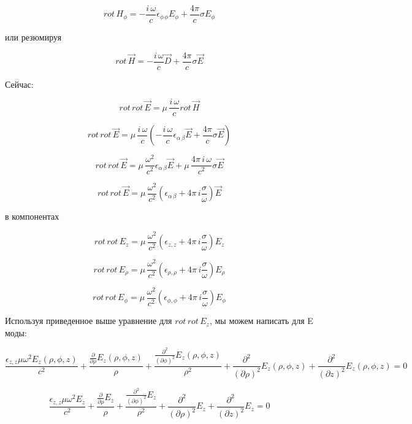 \documentclass{article}
\begin{document}
$$rot\,{H}_{\phi} = - \frac{i\,\omega}{c} \epsilon_{\phi\,\phi} {E}_{\phi}+ \frac{4\pi}{c} \sigma {E}_{\phi}$$

или резюмируя

$$rot\,\vec{H} = - \frac{i\,\omega}{c} \vec{D} + \frac{4\pi}{c} \sigma \vec{E}$$

Сейчас:

$$rot\,rot\,\vec{E} = \mu\,\frac{i\,\omega}{c}rot\,\vec{H}$$

$$rot\,rot\,\vec{E} = \mu\,\frac{i\,\omega}{c}\left(-\frac{i\,\omega}{c}{\epsilon}_{\alpha\,\beta}\vec{E} + \frac{4\pi}{c}\sigma\vec{E}\right)$$

$$rot\,rot\,\vec{E} = \mu\,\frac{\omega^2}{c^2} {\epsilon}_{\alpha\,\beta} \vec{E} + \mu\,\frac{4\pi\,i\,\omega}{c^2} \sigma \vec{E}$$

$$rot\,rot\,\vec{E} = \mu\,\frac{\omega^2}{c^2} \left({\epsilon}_{\alpha\,\beta} + 4\pi\,i\frac{\sigma}{\omega}\right) \vec{E}$$

в компонентах

$$rot\,rot\,{E}_{z} = \mu\,\frac{\omega^2}{c^2} \left({\epsilon}_{z,z} + 4\pi\,i\frac{\sigma}{\omega}\right) {E}_{z}$$

$$rot\,rot\,{E}_{\rho} = \mu\,\frac{\omega^2}{c^2} \left({\epsilon}_{\rho,\rho} + 4\pi\,i\frac{\sigma}{\omega}\right) {E}_{\rho}$$

$$rot\,rot\,{E}_{\phi} = \mu\,\frac{\omega^2}{c^2} \left({\epsilon}_{\phi,\phi} + 4\pi\,i\frac{\sigma}{\omega}\right) {E}_{\phi}$$

Используя приведенное выше уравнение для  $rot\,rot\,{E}_{z}$, мы можем написать для E моды:

$$\frac{{\epsilon}_{z,z} \mu \omega^{2} E_{z}\left({\rho}, {\phi}, \mathit{z}\right)}{c^{2}} + \frac{\frac{\partial}{\partial {\rho}}E_{z}\left({\rho}, {\phi}, \mathit{z}\right)}{{\rho}} + \frac{\frac{\partial^{2}}{(\partial {\phi})^{2}}E_{z}\left({\rho}, {\phi}, \mathit{z}\right)}{{\rho}^{2}} + \frac{\partial^{2}}{(\partial {\rho})^{2}}E_{z}\left({\rho}, {\phi}, \mathit{z}\right) + \frac{\partial^{2}}{(\partial \mathit{z})^{2}}E_{z}\left({\rho}, {\phi}, \mathit{z}\right) = 0$$


$$\frac{{\epsilon}_{z,z} \mu \omega^{2} E_{z}}{c^{2}} + \frac{\frac{\partial}{\partial {\rho}}E_{z}}{{\rho}} + \frac{\frac{\partial^{2}}{(\partial {\phi})^{2}}E_{z}}{{\rho}^{2}} + \frac{\partial^{2}}{(\partial {\rho})^{2}}E_{z} + \frac{\partial^{2}}{(\partial \mathit{z})^{2}}E_{z} = 0$$
\end{document}
